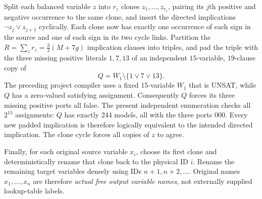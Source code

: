\documentclass[11pt]{article}
\begin{document}
Split each balanced variable $z$ into $r_z$ clones $z_1,\ldots,z_{r_z}$, pairing its $j$th positive and negative occurrence to the same clone, and insert the directed implications $\neg z_j\vee z_{j+1}$ cyclically. Each clone now has exactly one occurrence of each sign in the source and one of each sign in its two cycle links. Partition the $R=\sum_z r_z=\tfrac32(M+7g)$ implication clauses into triples, and pad the triple with the three missing positive literals $1,7,13$ of an independent $15$-variable, $19$-clause copy of
\[
 Q=W_1\setminus\{1\vee7\vee13\}.
\]
The preceding project compiler uses a fixed 15-variable $W_1$ that is UNSAT, while $Q$ has a zero-valued satisfying assignment. Consequently $Q$ forces its three missing positive ports all false. The present independent enumeration checks all $2^{15}$ assignments: $Q$ has exactly 244 models, all with the three ports $000$. Every new padded implication is therefore logically equivalent to the intended directed implication. The clone cycle forces all copies of $z$ to agree.

Finally, for each original source variable $x_i$, choose its first clone and deterministically rename that clone back to the physical ID $i$. Rename the remaining target variables densely using IDs $n+1,n+2,\ldots$. Original names $x_1,\ldots,x_n$ are therefore \emph{actual free output variable names}, not externally supplied lookup-table labels.
\end{document}
